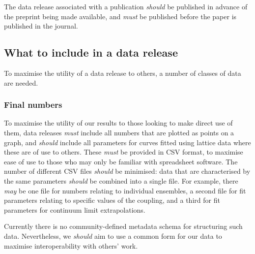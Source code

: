 \documentclass{article}
\newcommand\rfcword[1]{\emph{#1}\xspace}
\newcommand\must{\rfcword{must}}
\newcommand\should{\rfcword{should}}
\newcommand\may{\rfcword{may}}
\begin{document}
The data release associated with a publication
\should be published in advance of the preprint being made available,
and \must be published before the paper is published in the journal.

\subsection{What to include in a data release}

To maximise the utility of a data release to others,
a number of classes of data are needed.

\subsubsection{Final numbers}\label{sec:dr-numbers}

To maximise the utility of our results to those looking to make direct use of them,
data releases \must include all numbers that are plotted as points on a graph,
and \should include all parameters for curves fitted using lattice data
where these are of use to others.
These \must be provided in CSV format,
to maximise ease of use to those who may only be familiar with spreadsheet software.
The number of different CSV files \should be minimised:
data that are characterised by the same parameters
\should be combined into a single file.
For example,
there \may be one file for numbers relating to individual ensembles,
a second file for fit parameters relating to specific values of the coupling,
and a third for fit parameters for continuum limit extrapolations.

Currently there is no community-defined metadata schema for structuring such data.
Nevertheless,
we \should aim to use a common form for our data
to maximise interoperability with others' work.
\end{document}
